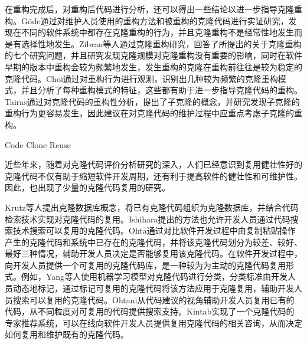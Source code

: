 在重构完成后，对重构后代码进行分析，还可以得出一些结论以进一步指导克隆重构\cite{gode2010clone,zibran2013evaluating,eunjong2014investigation,eunjong2014investigation}。G{\"o}de通过对维护人员使用的重构方法和被重构的克隆代码进行实证研究，发现在不同的软件系统中都存在克隆重构的行为，并且克隆重构不是经常性地发生而是有选择性地发生\cite{gode2010clone}。Zibran等人通过克隆重构研究，回答了所提出的关于克隆重构的七个研究问题，并且研究发现克隆规模对克隆重构没有重要的影响，同时在软件早期的版本中重构会较为频繁地发生，发生重构的克隆在重构前往往是较为稳定的克隆代码\cite{zibran2013evaluating}。Choi通过对重构行为进行观测，识别出几种较为频繁的克隆重构模式，并且分析了每种重构模式的特征，这些都有助于进一步指导克隆代码的重构\cite{eunjong2014investigation}。Tairas通过对克隆代码的重构性分析，提出了子克隆的概念，并研究发现子克隆的重构行为更容易发生，因此建议在对克隆代码的维护过程中应重点考虑子克隆的重构\cite{tairas2010sub}。


{Code Clone Reuse}

近些年来，随着对克隆代码评价分析研究的深入，人们已经意识到复用健壮性好的克隆代码不仅有助于缩短软件开发周期，还有利于提高软件的健壮性和可维护性。因此，也出现了少量的克隆代码复用的研究。


Krutz等人提出克隆数据库概念，将已有克隆代码组织为克隆数据库，并结合代码检索技术实现对克隆代码的复用\cite{krutz2014code}。Ishihara提出的方法也允许开发人员通过代码搜索技术搜索可以复用的克隆代码\cite{ishihara2013reusing}。Ohta通过对比软件开发过程中由复制粘贴操作产生的克隆代码和系统中已存在的克隆代码，并将该克隆代码划分为较差、较好、最好三种情况，辅助开发人员决定是否能够复用该克隆代码\cite{ohta2015source}。在软件开发过程中，向开发人员提供一个可复用的克隆代码库，是一种较为为主动的克隆代码复用形式。例如，Yang\cite{yang2015classification}等人使用机器学习模型对克隆代码进行分类，分类标准由开发人员动态地标记，通过标记可复用的克隆代码将该方法应用于克隆复用，辅助开发人员搜索可以复用的克隆代码。Ohtani从代码建议的视角辅助开发人员复用已有的代码，从不同粒度对可复用的代码提供搜索支持\cite{ohtani2015level}。Kintab实现了一个克隆代码的专家推荐系统，可以在线向软件开发人员提供复用克隆代码的相关咨询，从而决定如何复用和维护既有的克隆代码\cite{kintab2014recommending}。

